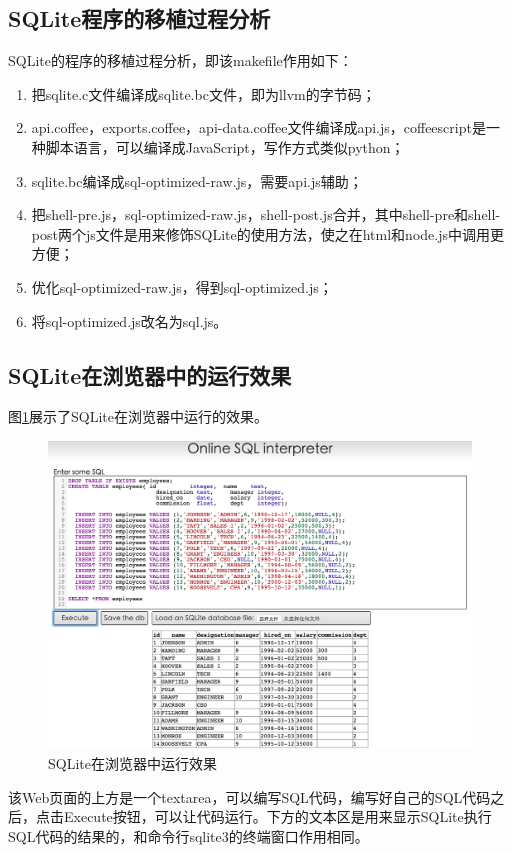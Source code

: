 \subsection{SQLite程序的移植过程分析}

SQLite的程序的移植过程分析，即该makefile作用如下：

\begin{enumerate}[itemindent=2em]
    \item 把sqlite.c文件编译成sqlite.bc文件，即为llvm的字节码；
    \item api.coffee，exports.coffee，api-data.coffee文件编译成api.js，coffeescript是一种脚本语言，可以编译成JavaScript，写作方式类似python；
    \item sqlite.bc编译成sql-optimized-raw.js，需要api.js辅助；
	\item 把shell-pre.js，sql-optimized-raw.js，shell-post.js合并，其中shell-pre和shell-post两个js文件是用来修饰SQLite的使用方法，使之在html和node.js中调用更方便；
	\item 优化sql-optimized-raw.js，得到sql-optimized.js；
	\item 将sql-optimized.js改名为sql.js。
\end{enumerate}

\subsection{SQLite在浏览器中的运行效果}

图\ref{sqlite-html}展示了SQLite在浏览器中运行的效果。

\begin{figure}[h!] %
    \centering
    \includegraphics[width=450bp]{figure/pic/sqlite-sample-html.png}
    \caption{SQLite在浏览器中运行效果}
    \label{sqlite-html}
\end{figure}

该Web页面的上方是一个textarea，可以编写SQL代码，编写好自己的SQL代码之后，点击Execute按钮，可以让代码运行。下方的文本区是用来显示SQLite执行SQL代码的结果的，和命令行sqlite3的终端窗口作用相同。